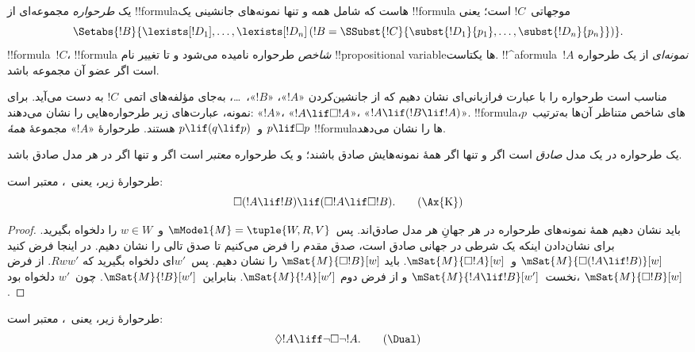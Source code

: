 \documentclass[../../../include/open-logic-section]{subfiles}
\begin{document}


\begin{defn}
  یک \emph{طرحواره} مجموعه‌ای از !!{formula}هاست که شامل همه و تنها
  نمونه‌های جانشینی یک !!{formula} موجهاتی~$!C$ است؛ یعنی
  \[
  \Setabs{!B}{\lexists[!D_1], \dots, \lexists[!D_n] \left(!B =
  \SSubst{!C}{\subst{!D_1}{p_1}, \dots, \subst{!D_n}{p_n}} \right) }.
  \]
  !!{formula}~$!C$، !!{formula} \emph{شاخص} طرحواره نامیده می‌شود و
  تا تغییر نام !!{propositional variable}ها یکتاست. !!^a{formula}~$!A$
  \emph{نمونه‌ای} از یک طرحواره است اگر عضو آن مجموعه باشد.
\end{defn}

مناسب است طرحواره را با عبارت فرازبانی‌ای نشان دهیم که از جانشین‌کردن
«$!A$»، «$!B$»،~\dots، به‌جای مؤلفه‌های اتمی~$!C$ به دست می‌آید. برای
نمونه، عبارت‌های زیر طرحواره‌هایی را نشان می‌دهند: «$!A$»،
«$!A \lif \Box!A$»، «$!A \lif (!B \lif !A)$». !!{formula}های شاخص
متناظر آن‌ها به‌ترتیب~$p$، $p \lif \Box p$ و~$p \lif (q \lif p)$
هستند. طرحوارهٔ «$!A$» مجموعهٔ \emph{همهٔ} !!{formula}ها را نشان می‌دهد.

\begin{defn}
  یک طرحواره در یک مدل \emph{صادق} است اگر و تنها اگر همهٔ نمونه‌هایش
  صادق باشند؛ و یک طرحواره \emph{معتبر} است اگر و تنها اگر در هر مدل
  صادق باشد.
\end{defn}

\begin{prop}
  طرحوارهٔ زیر، یعنی~، معتبر است:
  \begin{equation*}
  \Box(!A \lif !B) \lif (\Box !A \lif \Box !B). \tag{\Ax{K}}
  \end{equation*}
\end{prop}

\begin{proof}
  باید نشان دهیم همهٔ نمونه‌های طرحواره در هر جهانِ هر مدل صادق‌اند.
  پس~$\mModel{M} = \tuple{W,R,V}$ و~$w \in W$ را دلخواه بگیرید. برای
  نشان‌دادن اینکه یک شرطی در جهانی صادق است، صدق مقدم را فرض می‌کنیم
  تا صدق تالی را نشان دهیم. در اینجا فرض کنید
  $\mSat{M}{\Box(!A \lif !B)}[w]$ و~$\mSat{M}{\Box !A}[w]$. باید
  $\mSat{M}{\Box !B}[w]$ را نشان دهیم. پس~$w'$ای دلخواه بگیرید که
  $Rww'$. از فرض نخست~$\mSat{M}{!A \lif !B}[w']$ و از فرض دوم
  $\mSat{M}{!A}[w']$. بنابراین~$\mSat{M}{!B}[w']$. چون~$w'$ دلخواه
  بود، $\mSat{M}{\Box !B}[w]$.
\end{proof}

\begin{prop}
  طرحوارهٔ زیر، یعنی~\Dual{}، معتبر است:
  \begin{equation*}
  \Diamond !A \liff \lnot\Box\lnot !A. \tag{\Dual}
  \end{equation*}
\end{prop}
\end{document}
